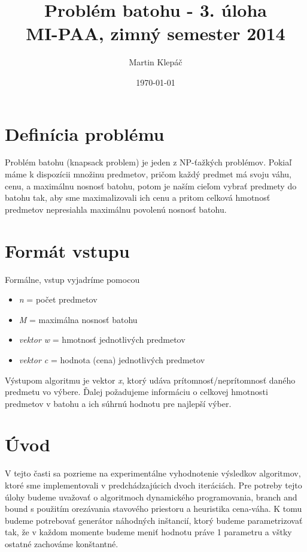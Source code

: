 \documentclass[slovak]{article}
\begin{document}
\title{Problém batohu - 3. úloha \\[5mm] MI-PAA, zimný semester 2014}
\author{Martin Klepáč}
\date{\today}

\maketitle

\section{Definícia problému}

Problém batohu (knapsack problem) je jeden z NP-ťažkých problémov. Pokiaľ máme k dispozícii množinu predmetov, pričom každý predmet má svoju váhu, cenu, a maximálnu nosnosť batohu, potom je naším cieľom vybrať predmety do batohu tak, aby sme maximalizovali ich cenu a pritom celková hmotnosť predmetov nepresiahla maximálnu povolenú nosnosť batohu.

\section{Formát vstupu}

Formálne, vstup vyjadríme pomocou

\begin{itemize}

\item \emph{n} = počet predmetov

\item \emph{M} = maximálna nosnosť batohu

\item \emph{vektor w} = hmotnosť jednotlivých predmetov

\item \emph{vektor c} = hodnota (cena) jednotlivých predmetov

\end{itemize}

Výstupom algoritmu je vektor \emph{x}, ktorý udáva prítomnosť/neprítomnosť daného predmetu vo výbere. Ďalej požadujeme informáciu o celkovej hmotnosti predmetov v batohu a ich súhrnú hodnotu pre najlepší výber.


\section{Úvod}

V tejto časti sa pozrieme na experimentálne vyhodnotenie výsledkov algoritmov, ktoré sme implementovali v predchádzajúcich dvoch iteráciách. Pre potreby tejto úlohy budeme uvažovať o algoritmoch dynamického programovania, branch and bound s použitím orezávania stavového priestoru a heuristika cena-váha. K tomu budeme potrebovať generátor náhodných inštancií, ktorý budeme parametrizovať tak, že v každom momente budeme meniť hodnotu práve 1 parametru a vštky ostatné zachováme konštantné.
\end{document}
